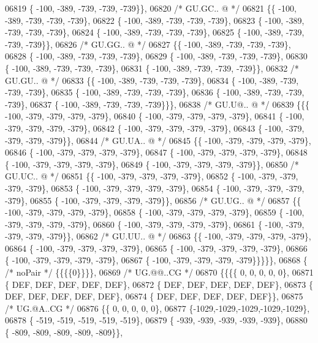 \begin{DoxyCode}
06819 \{ -100, -389, -739, -739, -739\}\},
06820 \textcolor{comment}{/* GU.GC.. @ */}
06821 \{\{ -100, -389, -739, -739, -739\},
06822 \{ -100, -389, -739, -739, -739\},
06823 \{ -100, -389, -739, -739, -739\},
06824 \{ -100, -389, -739, -739, -739\},
06825 \{ -100, -389, -739, -739, -739\}\},
06826 \textcolor{comment}{/* GU.GG.. @ */}
06827 \{\{ -100, -389, -739, -739, -739\},
06828 \{ -100, -389, -739, -739, -739\},
06829 \{ -100, -389, -739, -739, -739\},
06830 \{ -100, -389, -739, -739, -739\},
06831 \{ -100, -389, -739, -739, -739\}\},
06832 \textcolor{comment}{/* GU.GU.. @ */}
06833 \{\{ -100, -389, -739, -739, -739\},
06834 \{ -100, -389, -739, -739, -739\},
06835 \{ -100, -389, -739, -739, -739\},
06836 \{ -100, -389, -739, -739, -739\},
06837 \{ -100, -389, -739, -739, -739\}\}\},
06838 \textcolor{comment}{/* GU.U@.. @ */}
06839 \{\{\{ -100, -379, -379, -379, -379\},
06840 \{ -100, -379, -379, -379, -379\},
06841 \{ -100, -379, -379, -379, -379\},
06842 \{ -100, -379, -379, -379, -379\},
06843 \{ -100, -379, -379, -379, -379\}\},
06844 \textcolor{comment}{/* GU.UA.. @ */}
06845 \{\{ -100, -379, -379, -379, -379\},
06846 \{ -100, -379, -379, -379, -379\},
06847 \{ -100, -379, -379, -379, -379\},
06848 \{ -100, -379, -379, -379, -379\},
06849 \{ -100, -379, -379, -379, -379\}\},
06850 \textcolor{comment}{/* GU.UC.. @ */}
06851 \{\{ -100, -379, -379, -379, -379\},
06852 \{ -100, -379, -379, -379, -379\},
06853 \{ -100, -379, -379, -379, -379\},
06854 \{ -100, -379, -379, -379, -379\},
06855 \{ -100, -379, -379, -379, -379\}\},
06856 \textcolor{comment}{/* GU.UG.. @ */}
06857 \{\{ -100, -379, -379, -379, -379\},
06858 \{ -100, -379, -379, -379, -379\},
06859 \{ -100, -379, -379, -379, -379\},
06860 \{ -100, -379, -379, -379, -379\},
06861 \{ -100, -379, -379, -379, -379\}\},
06862 \textcolor{comment}{/* GU.UU.. @ */}
06863 \{\{ -100, -379, -379, -379, -379\},
06864 \{ -100, -379, -379, -379, -379\},
06865 \{ -100, -379, -379, -379, -379\},
06866 \{ -100, -379, -379, -379, -379\},
06867 \{ -100, -379, -379, -379, -379\}\}\}\}\},
06868 \{ \textcolor{comment}{/* noPair */} \{\{\{\{0\}\}\}\},
06869 \textcolor{comment}{/* UG.@@..CG */}
06870 \{\{\{\{    0,    0,    0,    0,    0\},
06871 \{  DEF,  DEF,  DEF,  DEF,  DEF\},
06872 \{  DEF,  DEF,  DEF,  DEF,  DEF\},
06873 \{  DEF,  DEF,  DEF,  DEF,  DEF\},
06874 \{  DEF,  DEF,  DEF,  DEF,  DEF\}\},
06875 \textcolor{comment}{/* UG.@A..CG */}
06876 \{\{    0,    0,    0,    0,    0\},
06877 \{-1029,-1029,-1029,-1029,-1029\},
06878 \{ -519, -519, -519, -519, -519\},
06879 \{ -939, -939, -939, -939, -939\},
06880 \{ -809, -809, -809, -809, -809\}\},

\end{DoxyCode}
